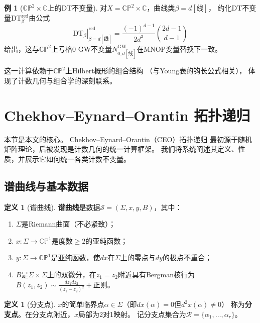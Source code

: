 \documentclass[11pt,a4paper]{article}
\theoremstyle{plain}
\theoremstyle{definition}
\newtheorem{definition}[theorem]{定义}
\newtheorem{example}[theorem]{例}
\newcommand{\C}{\mathbb{C}}
\newcommand{\CP}{\mathbb{CP}}
\newcommand{\GWinv}{N^{\mathrm{GW}}}
\newcommand{\DTinv}{\mathrm{DT}}
\begin{document}
\begin{example}[$\CP^2 \times \C$上的DT不变量]\label{ex:dtcp2}
对$X = \CP^2 \times \C$，曲线类$\beta = d[\text{线}]$，
约化DT不变量$\DTinv_{\beta}^{\mathrm{red}}$由公式
\[
\left.\DTinv_{\beta}\right|^{\mathrm{red}}_{\beta=d[\text{线}]} = \frac{(-1)^{d-1}}{2d^3} \binom{2d-1}{d-1}
\]
给出，这与$\CP^2$上亏格0 GW不变量$\GWinv_{0,d[\text{线}]}$在MNOP变量替换下一致。
\end{example}

这一计算依赖于$\CP^2$上Hilbert概形的组合结构
（与Young表的钩长公式相关），
体现了计数几何与组合学的深刻联系。




\section{Chekhov--Eynard--Orantin 拓扑递归}\label{sec:toprec}

本节是本文的核心。
Chekhov--Eynard--Orantin（CEO）拓扑递归\cite{EO2007, EO2015}
最初源于随机矩阵理论，后被发现是计数几何的统一计算框架。
我们将系统阐述其定义、性质，并展示它如何统一各类计数不变量。

\subsection{谱曲线与基本数据}

\begin{definition}[谱曲线]\label{def:spectral}
\textbf{谱曲线}是数据$\mathcal{S} = (\Sigma, x, y, B)$，其中：
\begin{enumerate}[label=(\arabic*)]
\item $\Sigma$是Riemann曲面（不必紧致）；
\item $x: \Sigma \to \CP^1$是度数$\geq 2$的亚纯函数；
\item $y: \Sigma \to \CP^1$是亚纯函数，使$dx$在$\Sigma$上的零点与$dy$的极点不重合；
\item $B$是$\Sigma \times \Sigma$上的双微分，在$z_1 = z_2$附近具有Bergman核行为
$B(z_1, z_2) \sim \frac{dz_1 dz_2}{(z_1 - z_2)^2} + \text{正则}$。
\end{enumerate}
\end{definition}

\begin{definition}[分支点]\label{def:branch}
$x$的简单临界点$\alpha \in \Sigma$（即$dx(\alpha) = 0$但$d^2x(\alpha) \neq 0$）
称为\textbf{分支点}。在分支点附近，$x$局部为2对1映射。
记分支点集合为$\mathcal{R} = \{\alpha_1, \ldots, \alpha_r\}$。
\end{definition}
\end{document}
